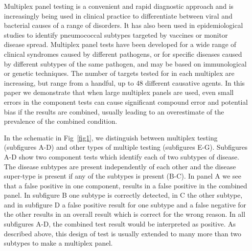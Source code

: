\documentclass[10pt,letterpaper]{article}
\begin{document}
Multiplex panel testing is a convenient and rapid diagnostic approach and is increasingly being used in clinical practice to differentiate between viral and bacterial causes of a range of disorders\cite{ramanan2017}. It has also been used in epidemiological studies to identify pneumococcal subtypes targeted by vaccines\cite{bonten2015} or monitor disease spread\cite{henson2023}. Multiplex panel tests have been developed for a wide range of clinical syndromes caused by different pathogens, or for specific diseases caused by different subtypes of the same pathogen\cite{ramanan2017}, and may be based on immunological\cite{pride2012,kalina2020} or genetic techniques\cite{mengelle2013,murphy2020,jaaskelainen2006,jansen2011,grondahl1999,hendolin1997}. The number of targets tested for in each multiplex are increasing, but range from a handful, up to 48 different causative agents\cite{henson2023}. In this paper we demonstrate that when large multiplex panels are used, even small errors in the component tests can cause significant compound error and potential bias if the results are combined, usually leading to an overestimate of the prevalence of the combined condition.

In the schematic in Fig~\ref{fig1}, we distinguish between multiplex testing (subfigures A-D) and other types of multiple testing (subfigures E-G). Subfigures A-D show two component tests which identify each of two subtypes of disease. The disease subtypes are present independently of each other and the disease super-type is present if any of the subtypes is present (B-C). In panel A we see that a false positive in one component, results in a false positive in the combined panel. In subfigure B one subtype is correctly detected, in C the other subtype, and in subfigure D a false positive result for one subtype and a false negative for the other results in an overall result which is correct for the wrong reason. In all subfigures A-D, the combined test result would be interpreted as positive. As described above, this design of test is usually extended to many more than two subtypes to make a multiplex panel.
\end{document}
